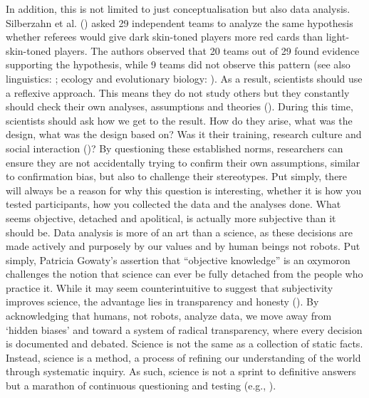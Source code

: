\documentclass[
  letterpaper,
]{book}
\begin{document}
In addition, this is not limited to just conceptualisation but also data
analysis. Silberzahn et al. ()
asked 29 independent teams to analyze the same hypothesis whether
referees would give dark skin-toned players more red cards than
light-skin-toned players. The authors observed that 20 teams out of 29
found evidence supporting the hypothesis, while 9 teams did not observe
this pattern (see also linguistics:
;
ecology and evolutionary biology: ). As a result, scientists should use a reflexive approach.
This means they do not study others but they constantly should check
their own analyses, assumptions and theories
().
During this time, scientists should ask how we get to the result. How do
they arise, what was the design, what was the design based on? Was it
their training, research culture and social interaction
()? By
questioning these established norms, researchers can ensure they are not
accidentally trying to confirm their own assumptions, similar to
confirmation bias, but also to challenge their stereotypes. Put simply,
there will always be a reason for why this question is interesting,
whether it is how you tested participants, how you collected the data
and the analyses done. What seems objective, detached and apolitical, is
actually more subjective than it should be. Data analysis is more of an
art than a science, as these decisions are made actively and purposely
by our values and by human beings not robots. Put simply, Patricia
Gowaty's assertion that ``objective knowledge'' is an oxymoron
challenges the notion that science can ever be fully detached from the
people who practice it. While it may seem counterintuitive to suggest
that subjectivity improves science, the advantage lies in transparency
and honesty (). By
acknowledging that humans, not robots, analyze data, we move away from
`hidden biases' and toward a system of radical transparency, where every
decision is documented and debated. Science is not the same as a
collection of static facts. Instead, science is a method, a process of
refining our understanding of the world through systematic inquiry. As
such, science is not a sprint to definitive answers but a marathon of
continuous questioning and testing (e.g.,
).
\end{document}
